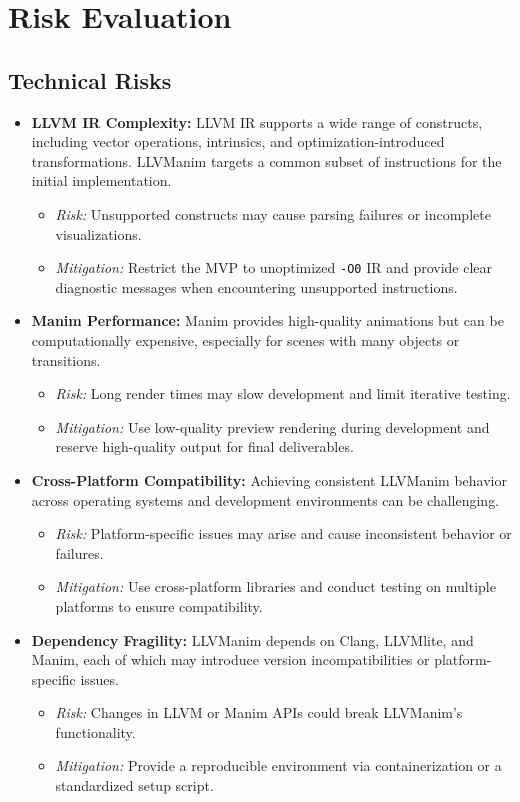 \section{Risk Evaluation}
\subsection{Technical Risks}
\begin{itemize}
  \item \textbf{LLVM IR Complexity:} LLVM IR supports a wide range of constructs, including vector operations, intrinsics, and optimization-introduced transformations. LLVManim targets a common subset of instructions for the initial implementation.
  \begin{itemize}
    \item \textit{Risk:} Unsupported constructs may cause parsing failures or incomplete visualizations.
    \item \textit{Mitigation:} Restrict the MVP to unoptimized \texttt{-O0} IR and provide clear diagnostic messages when encountering unsupported instructions.
  \end{itemize}

  \item \textbf{Manim Performance:} Manim provides high-quality animations but can be computationally expensive, especially for scenes with many objects or transitions.
  \begin{itemize}
    \item \textit{Risk:} Long render times may slow development and limit iterative testing.
    \item \textit{Mitigation:} Use low-quality preview rendering during development and reserve high-quality output for final deliverables.
  \end{itemize}

  \item \textbf{Cross-Platform Compatibility:} Achieving consistent LLVManim behavior across operating systems and development environments can be challenging.
  \begin{itemize}
    \item \textit{Risk:} Platform-specific issues may arise and cause inconsistent behavior or failures.
    \item \textit{Mitigation:} Use cross-platform libraries and conduct testing on multiple platforms to ensure compatibility.
  \end{itemize}

  \item \textbf{Dependency Fragility:} LLVManim depends on Clang, LLVMlite, and Manim, each of which may introduce version incompatibilities or platform-specific issues.
  \begin{itemize}
    \item \textit{Risk:} Changes in LLVM or Manim APIs could break LLVManim's functionality.
    \item \textit{Mitigation:} Provide a reproducible environment via containerization or a standardized setup script.
  \end{itemize}
\end{itemize}


